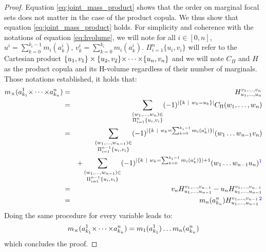 \begin{proof}
    Equation \eqref{eq:joint_mass_product} shows that the order on marginal focal sets does not matter in the case of the product copula. We thus show that equation \eqref{eq:joint_mass_product} holds.
    For simplicity and coherence with the notations of equation \eqref{eq:hvolume}, we will note for all $i\in[0,n]$, $u^i=\sum_{k=0}^{k_i-1}m_i(a_k^i)$, $v^i_k=\sum_{k=0}^{k_i}m_i(a_k^i)$. $\Pi_{i=1}^n\{u_i, v_i\}$ will refer to the Cartesian product $\{u_1, v_1\}\times\{u_2, v_2\}{\times\dots\times}\{u_n, v_n\}$ and we will note $C_\Pi$ and $H$ as the product copula and its H-volume regardless of their number of marginals. Those notations established, it holds that:
    \begin{eqnarray*}
        m_\times(a^1_{k_1}\tdt a^{n}_{k_{n}}) &=& H_{u_1, \dots, u_{n}}^{v_1, \dots, v_{n}}\\
        &=&\sum_{\substack{(w_1, \dots, w_{n})\in\\\Pi_{i=1}^{n}\{u_i, v_i\}}}(-1)^{|\{k~|~w_k=u_k\}|}C_\Pi(w_1, \dots, w_{n})\\
        &=&\sum_{\substack{(w_1, \dots, w_{n-1})\in\\\Pi_{i=1}^{n-1}\{u_i, v_i\}}}(-1)^{|\{k~|~w_k=\sum_{k=0}^{k_i-1}m_i(a^i_k)\}|}(w_1 \dots w_{n-1}v_{n})\\
        && + \sum_{\substack{(w_1, \dots, w_{n-1})\in\\\Pi_{i=1}^{n-1}\{u_i, v_i\}}}(-1)^{|\{k~|~w_k=\sum_{k=0}^{k_i-1}m_i(a^i_k)\}|+1}(w_1 \dots w_{n-1}u_n)\commanue{je ne suis pas sure de comprendre cette ligne}\\
        &=& v_{n}H_{u_1, \dots, u_{n-1}}^{v_1, \dots, v_{n-1}} - u_{n}H_{u_1, \dots, u_{n-1}}^{v_1, \dots, v_{n-1}}\\
        &=& m_{n}(a^{n}_{k_{n}})H_{u_1, \dots, u_{n-1}}^{v_1, \dots, v_{n-1}}\commanue{pareil pas compris}
    \end{eqnarray*}
    Doing the same procedure for every variable leads to:
    \begin{eqnarray*}
        m_\times(a^1_{k_1}{\times\dots\times} a^n_{k_n}) = m_1(a^1_{k_1})\dots m_n(a^n_{k_n})
    \end{eqnarray*}
    which concludes the proof.
\end{proof}

